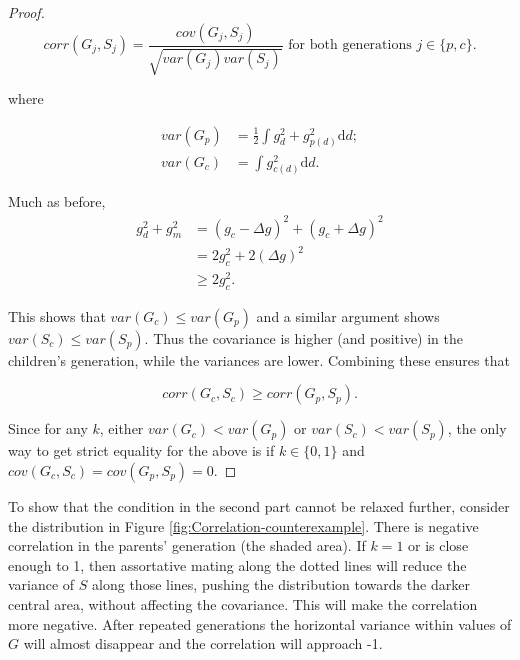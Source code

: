 \documentclass[
]{article}
\begin{document}
\begin{proof}
\begin{equation}
corr(G_{j},S_{j})=\frac{cov(G_{j},S_{j})}{\sqrt{var(G_{j})var(S_{j})}}\textrm{ for both generations }j\in\{p,c\}.\label{eq:corr-cov-var}
\end{equation}

where 

\begin{align*}
var(G_{p}) & =\frac{1}{2}\int g_{d}^{2}+g_{p(d)}^{2}\textrm{d}d;\\
var(G_{c}) & =\int g_{c(d)}^{2}\textrm{d}d.
\end{align*}

Much as before,
\begin{align*}
g_{d}^{2}+g_{m}^{2} & =(g_{c}-\Delta g)^{2}+(g_{c}+\Delta g)^{2}\\
 & =2g_{c}^{2}+2(\Delta g)^{2}\\
 & \ge2g_{c}^{2}.
\end{align*}

This shows that $var(G_{c})\le var(G_{p})$ and a similar argument
shows $var(S_{c})\le var(S_{p})$. Thus the covariance is higher (and
positive) in the children's generation, while the variances are lower.
Combining these ensures that 

\[
corr(G_{c},S_{c}) \ge corr(G_{p},S_{p}).
\]

Since for any $k$, either $var(G_{c}) < var(G_{p})$ or $var(S_{c}) < var(S_{p})$,
the only way to get strict equality for the above is if $k \in \{0,1\}$
and $cov(G_{c}, S_{c}) = cov(G_{p},S_{p}) = 0$.

\end{proof}

To show that the condition in the second part cannot be relaxed further,
consider the distribution in Figure
\ref{fig:Correlation-counterexample}. There is negative correlation in
the parents' generation (the shaded area). If \(k = 1\) or is close enough
to 1, then assortative mating along the dotted lines will reduce the
variance of \(S\) along those lines, pushing the distribution towards the
darker central area, without affecting the covariance. This will make
the correlation more negative. After repeated generations the horizontal
variance within values of \(G\) will almost disappear and the correlation
will approach -1.
\end{document}
